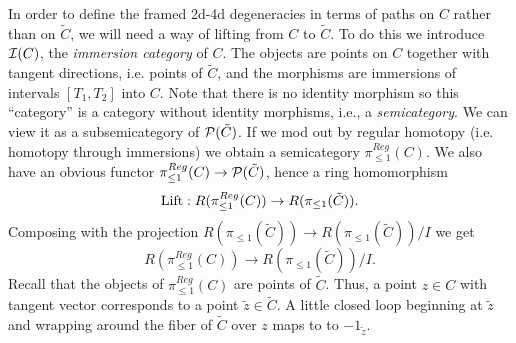 \documentclass[11pt,a4paper]{article}
\def\CI {{\cal I}}
\def\CP {{\cal P }}
\def\CI {{\cal I}}
\def\CP {{\cal P }}
\begin{document}
In order to define the framed 2d-4d degeneracies in terms of paths on $C$ rather
than on $\tilde C$, we will need a way of lifting from $C$ to $\tilde C$. To do this we introduce
$\CI(C)$, the \emph{immersion category} of $C$. The objects are points on $C$
together with tangent directions, i.e. points of $\tilde C$, and the morphisms are
immersions of intervals $[T_1,T_2]$ into $C$. Note that
there is no identity morphism so this ``category'' is a category without identity
morphisms, i.e., a \emph{semicategory}.
We can view it as a subsemicategory of $\CP(\tilde C)$.  If we
mod out by regular homotopy (i.e. homotopy through immersions) we obtain a semicategory $\pi^{Reg}_{\leq 1}(C)$.
We also have an obvious functor $\pi^{Reg}_{\leq 1}(C) \to \CP(\tilde C)$, hence a ring homomorphism
\begin{equation}\label{eq:Lift-map}
{\rm Lift}: R(\pi^{Reg}_{\leq 1}(C)) \to R(\pi_{\leq 1}(\tilde C)).
\end{equation}
Composing with the projection $R(\pi_{\leq 1}(\tilde C)) \to R(\pi_{\leq 1}(\tilde C)) / I$ we get
\begin{equation}\label{eq:map-to-quotient}
  R(\pi^{Reg}_{\leq 1}(C)) \to R(\pi_{\leq 1}(\tilde C))/I.
\end{equation}
Recall that the objects of $\pi^{Reg}_{\leq 1}(C)$ are points of
$\tilde C$. Thus, a point $z\in C$ with tangent vector corresponds
to a point $\tilde z\in \tilde C$. A little closed loop beginning at $\tilde z$
and wrapping around the fiber of $\tilde C$ over $z$
maps to  to $-1_{\tilde z}$.
\end{document}
